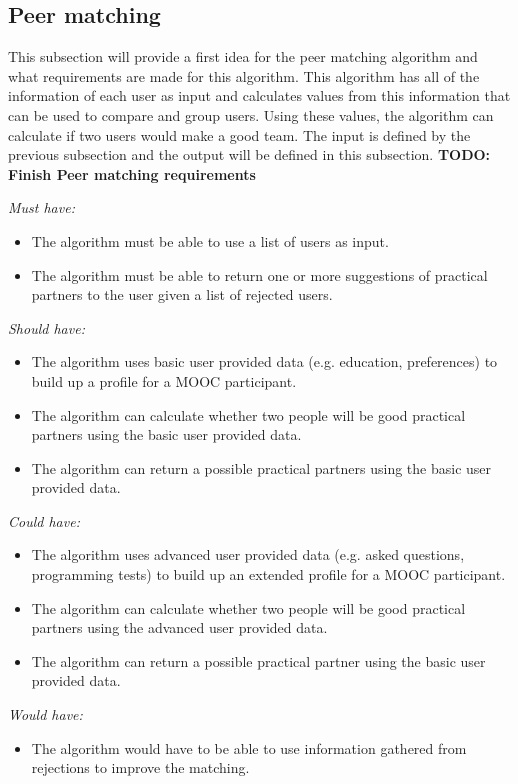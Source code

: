 \documentclass[]{article}
\newcommand{\TODO}[1]{{\color{red}\textbf{TODO: #1}}}
\newcommand{\reqr}[1]{{\noindent\emph{#1:}}}
\begin{document}
\subsection{Peer matching}
This subsection will provide a first idea for the peer matching algorithm and what requirements are made for this algorithm.
This algorithm has all of the information of each user as input and calculates values from this information that can be used to compare and group users.
Using these values, the algorithm can calculate if two users would make a good team.
The input is defined by the previous subsection and the output will be defined in this subsection.
\TODO{Finish Peer matching requirements}

\reqr{Must have}
\begin{itemize}
\item The algorithm must be able to use a list of users as input.
\item The algorithm must be able to return one or more suggestions of practical partners to the user given a list of rejected users.
\end{itemize}

\reqr{Should have}
\begin{itemize}
\item The algorithm uses basic user provided data (e.g. education, preferences) to build up a profile for a MOOC participant.
\item The algorithm can calculate whether two people will be good practical partners using the basic user provided data.
\item The algorithm can return a possible practical partners using the basic user provided data.
\end{itemize}

\reqr{Could have}
\begin{itemize}
\item The algorithm uses advanced user provided data (e.g. asked questions, programming tests) to build up an extended profile for a MOOC participant.
\item The algorithm can calculate whether two people will be good practical partners using the advanced user provided data.
\item The algorithm can return a possible practical partner using the basic user provided data.
\end{itemize}

\reqr{Would have}
\begin{itemize}
\item The algorithm would have to be able to use information gathered from rejections to improve the matching.
\end{itemize}
\end{document}
